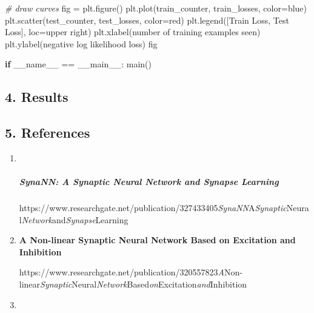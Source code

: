\documentclass[
]{article}
\newenvironment{Shaded}{}{}
\newcommand{\CommentTok}[1]{\textcolor[rgb]{0.38,0.63,0.69}{\textit{#1}}}
\newcommand{\ControlFlowTok}[1]{\textcolor[rgb]{0.00,0.44,0.13}{\textbf{#1}}}
\newcommand{\NormalTok}[1]{#1}
\newcommand{\OperatorTok}[1]{\textcolor[rgb]{0.40,0.40,0.40}{#1}}
\newcommand{\StringTok}[1]{\textcolor[rgb]{0.25,0.44,0.63}{#1}}
\newcommand{\VariableTok}[1]{\textcolor[rgb]{0.10,0.09,0.49}{#1}}
\begin{document}
\begin{Shaded}
\begin{Highlighting}[]
    \CommentTok{\# draw curves}
\NormalTok{    fig }\OperatorTok{=}\NormalTok{ plt.figure()}
\NormalTok{    plt.plot(train\_counter, train\_losses, color}\OperatorTok{=}\StringTok{\textquotesingle{}blue\textquotesingle{}}\NormalTok{)}
\NormalTok{    plt.scatter(test\_counter, test\_losses, color}\OperatorTok{=}\StringTok{\textquotesingle{}red\textquotesingle{}}\NormalTok{)}
\NormalTok{    plt.legend([}\StringTok{\textquotesingle{}Train Loss\textquotesingle{}}\NormalTok{, }\StringTok{\textquotesingle{}Test Loss\textquotesingle{}}\NormalTok{], loc}\OperatorTok{=}\StringTok{\textquotesingle{}upper right\textquotesingle{}}\NormalTok{)}
\NormalTok{    plt.xlabel(}\StringTok{\textquotesingle{}number of training examples seen\textquotesingle{}}\NormalTok{)}
\NormalTok{    plt.ylabel(}\StringTok{\textquotesingle{}negative log likelihood loss\textquotesingle{}}\NormalTok{)}
\NormalTok{    fig}
\end{Highlighting}
\end{Shaded}

\begin{Shaded}
\begin{Highlighting}[]
\ControlFlowTok{if} \VariableTok{\_\_name\_\_} \OperatorTok{==} \StringTok{\textquotesingle{}\_\_main\_\_\textquotesingle{}}\NormalTok{:}
\NormalTok{  main()}
\end{Highlighting}
\end{Shaded}

\hypertarget{header-n76}{%
\subsection{4. Results}\label{header-n76}}

\hypertarget{header-n78}{%
\subsection{5. References}\label{header-n78}}

\begin{enumerate}
\def\labelenumi{\arabic{enumi}.}
\item ~
  \hypertarget{header-n81}{%
  \subparagraph{SynaNN: A Synaptic Neural Network and Synapse
  Learning}\label{header-n81}}

  https://www.researchgate.net/publication/327433405\emph{SynaNN}A\emph{Synaptic}Neural\emph{Network}and\emph{Synapse}Learning
\item
  \textbf{A Non-linear Synaptic Neural Network Based on Excitation and
  Inhibition}

  https://www.researchgate.net/publication/320557823\emph{A}Non-linear\emph{Synaptic}Neural\emph{Network}Based\emph{on}Excitation\emph{and}Inhibition
\item
\end{enumerate}
\end{document}
